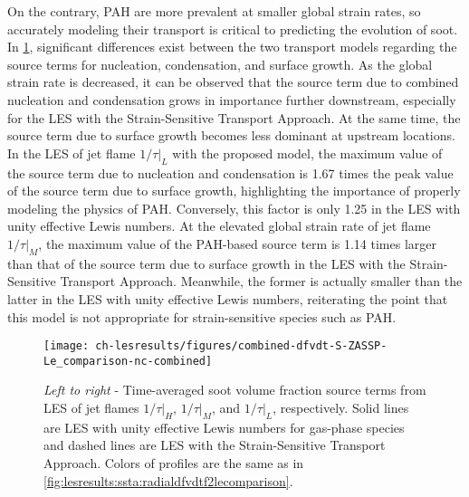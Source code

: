 On the contrary, PAH are more prevalent at smaller global strain rates, so accurately modeling their transport is critical to predicting the evolution of soot. In \cref{fig:lesresults:strain:allflamesdfvdt}, significant differences exist between the two transport models regarding the source terms for nucleation, condensation, and surface growth. As the global strain rate is decreased, it can be observed that the source term due to combined nucleation and condensation grows in importance further downstream, especially for the LES with the Strain-Sensitive Transport Approach. At the same time, the source term due to surface growth becomes less dominant at upstream locations. In the LES of jet flame $1/\tau|_L$ with the proposed model, the maximum value of the source term due to nucleation and condensation is 1.67 times the peak value of the source term due to surface growth, highlighting the importance of properly modeling the physics of PAH. Conversely, this factor is only 1.25 in the LES with unity effective Lewis numbers. At the elevated global strain rate of jet flame $1/\tau|_M$, the maximum value of the PAH-based source term is 1.14 times larger than that of the source term due to surface growth in the LES with the Strain-Sensitive Transport Approach. Meanwhile, the former is actually smaller than the latter in the LES with unity effective Lewis numbers, reiterating the point that this model is not appropriate for strain-sensitive species such as PAH.


\begin{figure}[htb]
  \centering
  \texttt{[image: ch-lesresults/figures/combined-dfvdt-S-ZASSP-Le\_comparison-nc-combined]}
  \caption[Centerline $\langle df_V/dt \rangle$ from LES of Flames $1/\tau|_H$, $1/\tau|_M$, and $1/\tau|_L$ with Various Transport Approaches]{\textit{Left to right} - Time-averaged soot volume fraction source terms from LES of jet flames $1/\tau|_H$, $1/\tau|_M$, and $1/\tau|_L$, respectively. Solid lines are LES with unity effective Lewis numbers for gas-phase species and dashed lines are LES with the Strain-Sensitive Transport Approach. Colors of profiles are the same as in \cref{fig:lesresults:ssta:radialdfvdtf2lecomparison}.}
  \label{fig:lesresults:strain:allflamesdfvdt}
\end{figure}

